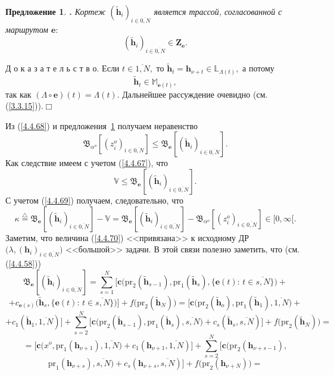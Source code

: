 \documentclass[11pt,twoside,openany]{report}
\newcommand{\bfn}{\begin{equation}}
\newcommand{\efn}{\end{equation}}
\newcommand{\df}{\stackrel{\triangle}{=}}
\newcommand{\ov}{\overline}
\newcounter{theo}
\newcounter{pred}
\newtheorem{pred}{Предложение}[section]
\newcommand{\TL}{\mbox{\bf{$\!\!$.}}}
\newcommand{\La}{\Lambda}
\newcommand{\la}{\lambda}
\newcommand{\al}{\alpha}
\newcommand{\bbl}{{\mathbb L}}
\newcommand{\bbm}{{\mathbb M}}
\begin{document}
{\begin{pred}\label{p4.4.5}{\TL} Кортеж $(\tilde{\mathbf{h}}_i)_{i\in\ov{0,N}}$
является трассой, согласованной с маршрутом $\mathbf{e}:$
$$
(\tilde{\mathbf{h}}_i)_{i\in\ov{0,N}}\in \mathbf{Z}_\mathbf{e}.
$$
\end{pred}

Д о к а з а т е л ь с т в о. Если $t\in \ov{1,N},$ то $\tilde{\mathbf{h}}_t =
\mathbf{h}_{\nu +t}\in \bbl_{\La(t)},$ а потому
$$
\tilde{\mathbf{h}}_t \in \bbm_{\mathbf{e}(t)},
$$
так как $(\La \circ \mathbf{e})(t) = \La(t).$ Дальнейшее рассуждение очевидно
(см. (\ref{3.3.15})).\hfill $\Box$ \smallskip

Из (\ref{4.4.68}) и предложения~{\ref{p4.4.5} получаем неравенство
$$
\mathfrak{B}_{\al^o}[(z_i^o)_{i\in\ov{0,N}}]\leqslant
\mathfrak{B}_\mathbf{e}[(\tilde{\mathbf{h}}_i)_{i\in\ov{0,N}}].
$$
Как следствие имеем с учетом (\ref{4.4.67}), что
\bfn\label{4.4.69}
\mathbb{V} \leqslant \mathfrak{B}_\mathbf{e}[(\tilde{\mathbf{h}}_i)_{i\in\ov{0,N}}].
\efn
С учетом (\ref{4.4.69}) получаем, следовательно, что
\bfn\label{4.4.70}
\kappa \df \mathfrak{B}_\mathbf{e}[(\tilde{\mathbf{h}}_i)_{i\in\ov{0,N}}] -
\mathbb{V} = \mathfrak{B}_\mathbf{e}[(\tilde{\mathbf{h}}_i)_{i\in\ov{0,N}}]-
\mathfrak{B}_{\al^o}[(z_i^o)_{i\in\ov{0,N}}]\in [0,\infty[.
\efn
Заметим, что величина (\ref{4.4.70}) <<привязана>> к исходному ДР $\bigl(\la,(\mathbf{h}_i)_{i\in\ov{0,N}}\bigl)$ <<большой>> задачи. В этой связи полезно заметить, что (см. (\ref{4.4.58}))
$$
\mathfrak{B}_\mathbf{e}[(\tilde{\mathbf{h}}_i)_{i\in\ov{0,N}}]=
\sum\limits_{s=1}^N\bigl[\mathbf{c}\bigl(\mathrm{pr}_2(\tilde{\mathbf{h}}_{s-1}),\mathrm{pr}_1
(\tilde{\mathbf{h}}_s),\{\mathbf{e}(t):\,t\in\ov{s,N}\}\bigl) +
$$
$$
+ c_{\mathbf{e}(s)}\bigl(\tilde{\mathbf{h}}_s,\{\mathbf{e}(t):\,t\in\ov{s,N}\}\bigl)\bigl] +
f\bigl(\mathrm{pr}_2(\tilde{\mathbf{h}}_N)\bigl) = \bigl[\mathbf{c}\bigl(\mathrm{pr}_2
(\tilde{\mathbf{h}}_o),\mathrm{pr}_1(\tilde{\mathbf{h}}_1),\ov{1,N}) +
$$
$$
+ c_1(\tilde{\mathbf{h}}_1,\ov{1,N})\bigl] +
\sum\limits_{s=2}^N\bigl[\mathbf{c}\bigl(\mathrm{pr}_2(\tilde{\mathbf{h}}_{s-1}),
\mathrm{pr}_1(\tilde{\mathbf{h}}_s),\ov{s,N}\bigl) +
c_s(\tilde{\mathbf{h}}_s,\ov{s,N})\bigl] +
f\bigl(\mathrm{pr}_2(\tilde{\mathbf{h}}_N)\bigl) =
$$
$$
= \bigl[\mathbf{c}\bigl(x^o,\mathrm{pr}_1(\mathbf{h}_{\nu+1}),\ov{1,N}\bigl) +
c_1(\mathbf{h}_{\nu+1},\ov{1,N})\bigl] +
\sum\limits_{s=2}^N\bigl[\mathbf{c}\bigl(\mathrm{pr}_2(\mathbf{h}_{\nu+s-1}),
$$
$$
\mathrm{pr}_1(\mathbf{h}_{\nu+s}),\ov{s,N}\bigl) + c_s(\mathbf{h}_{\nu+s},\ov{s,N})\bigl] +
f\bigl(\mathrm{pr}_2(\mathbf{h}_{\nu+N})\bigl) =
$$}}
\end{document}
